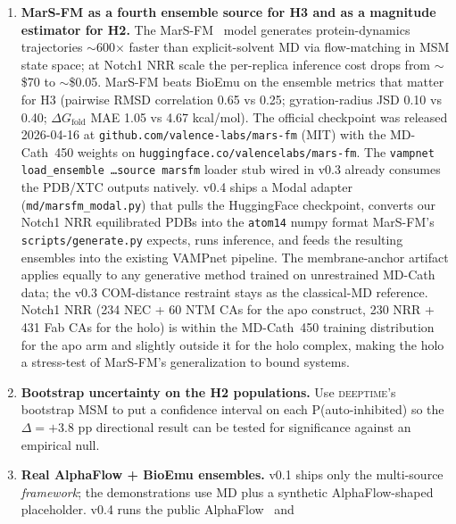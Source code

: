 \documentclass[11pt]{article}
\begin{document}
\begin{enumerate}[leftmargin=*,itemsep=4pt]
  \item \textbf{MarS-FM as a fourth ensemble source for H3 and
        as a magnitude estimator for H2.} The
        MarS-FM~\cite{kapusniak2025marsfm} model generates
        protein-dynamics trajectories $\sim$600$\times$ faster than
        explicit-solvent MD via flow-matching in MSM state space;
        at Notch1 NRR scale the per-replica inference cost drops
        from $\sim$\$70 to $\sim$\$0.05. MarS-FM beats BioEmu on
        the ensemble metrics that matter for H3 (pairwise RMSD
        correlation 0.65 vs 0.25; gyration-radius JSD 0.10 vs 0.40;
        $\Delta G_\mathrm{fold}$ MAE 1.05 vs 4.67 kcal/mol). The
        official checkpoint was released 2026-04-16 at
        \texttt{github.com/valence-labs/mars-fm} (MIT) with the
        MD-Cath~450 weights on
        \texttt{huggingface.co/valencelabs/mars-fm}. The
        \texttt{vampnet load\_ensemble \dots source marsfm} loader
        stub wired in v0.3 already consumes the PDB/XTC outputs
        natively. v0.4 ships a Modal adapter
        (\texttt{md/marsfm\_modal.py}) that pulls the HuggingFace
        checkpoint, converts our Notch1 NRR equilibrated PDBs into
        the \texttt{atom14} numpy format MarS-FM's
        \texttt{scripts/generate.py} expects, runs inference, and
        feeds the resulting ensembles into the existing VAMPnet
        pipeline. The membrane-anchor artifact applies equally to
        any generative method trained on unrestrained MD-Cath data;
        the v0.3 COM-distance restraint stays as the classical-MD
        reference. Notch1 NRR (234 NEC + 60 NTM CAs for the apo
        construct, 230 NRR + 431 Fab CAs for the holo) is within the
        MD-Cath~450 training distribution for the apo arm and
        slightly outside it for the holo complex, making the holo
        a stress-test of MarS-FM's generalization to bound systems.
  \item \textbf{Bootstrap uncertainty on the H2 populations.} Use
        \textsc{deeptime}'s bootstrap MSM to put a confidence
        interval on each P(auto-inhibited) so the $\Delta = +3.8$
        pp directional result can be tested for significance
        against an empirical null.
  \item \textbf{Real AlphaFlow + BioEmu ensembles.} v0.1 ships
        only the multi-source \emph{framework}; the demonstrations
        use MD plus a synthetic AlphaFlow-shaped placeholder. v0.4
        runs the public
        AlphaFlow~\cite{jing2024alphaflow} and

\end{enumerate}
\end{document}
